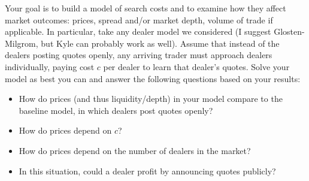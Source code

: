 \documentclass[11pt
]{exam}
\begin{document}
Your goal is to build a model of search costs and to examine how they affect market outcomes: prices, spread and/or market depth, volume of trade if applicable. In particular, take any dealer model we considered (I suggest Glosten-Milgrom, but Kyle can probably work as well). Assume that instead of the dealers posting quotes openly, any arriving trader must approach dealers individually, paying cost $c$ per dealer to learn that dealer's quotes. Solve your model as best you can and answer the following questions based on your results:
\begin{itemize}
	\item How do prices (and thus liquidity/depth) in your model compare to the baseline model, in which dealers post quotes openly?
	\item How do prices depend on $c$? 
	\item How do prices depend on the number of dealers in the market?
	\item In this situation, could a dealer profit by announcing quotes publicly?
\end{itemize}
\end{document}
